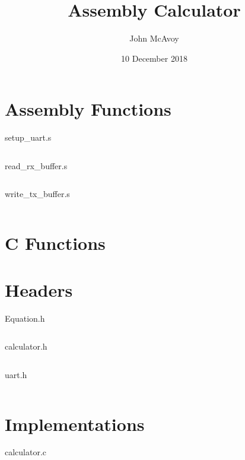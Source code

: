 \documentclass{article}
\begin{document}
\title{Assembly Calculator}
\author{John McAvoy}
\date{10 December 2018}
\maketitle

\section{Assembly Functions}

\begin{listing}[H]
  \caption{setup\_uart.s}
  \inputminted{gas}{../msp432401/src/setup_uart.s}
\end{listing}

\begin{listing}[H]
  \caption{read\_rx\_buffer.s}
  \inputminted{gas}{../msp432401/src/read_rx_buffer.s}
\end{listing}

\begin{listing}[H]
  \caption{write\_tx\_buffer.s}
  \inputminted{gas}{../msp432401/src/write_tx_buffer.s}
\end{listing}

\section{C Functions}
\section{Headers}
\begin{listing}[H]
  \caption{Equation.h}
  \inputminted{C}{../msp432401/src/Equation.h}
\end{listing}

\begin{listing}[H]
  \caption{calculator.h}
  \inputminted{C}{../msp432401/src/calculator.h}
\end{listing}

\begin{listing}[H]
  \caption{uart.h}
  \inputminted{C}{../msp432401/src/uart.h}
\end{listing}

\section{Implementations}

\begin{listing}[H]
  \caption{calculator.c}
  \inputminted{C}{../msp432401/src/calculator.c}
\end{listing}
\end{document}
